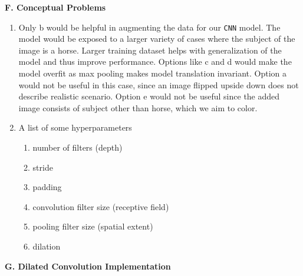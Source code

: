 \documentclass[11pt]{article}
\begin{document}
\textbf{F. Conceptual Problems}

\begin{enumerate}
    \item Only b would be helpful in augmenting the data for our \texttt{CNN} model. The model would be exposed to a larger variety of cases where the subject of the image is a horse. Larger training dataset helps with generalization of the model and thus improve performance. Options like c and d would make the model overfit as max pooling makes model translation invariant. Option a would not be useful in this case, since an image flipped upside down does not describe realistic scenario. Option e would not be useful since the added image consists of subject other than horse, which we aim to color.
    \item A list of some hyperparameters 
    \begin{enumerate}
        \item number of filters (depth)
        \item stride
        \item padding
        \item convolution filter size (receptive field)
        \item pooling filter size (spatial extent)
        \item dilation 
    \end{enumerate}
\end{enumerate}

\textbf{G. Dilated Convolution Implementation}
\end{document}
